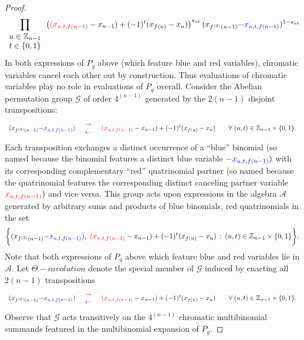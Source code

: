 \begin{proof}
\[\prod_{\begin{array}{c}
u\in\mathbb{Z}_{n-1}\\
t\in\{0,1\}
\end{array}}\big({\color{red}(x_{u,t,f(n-1)}}-x_{n-1})+(-1)^{t}(x_{f(u)}-x_{u})\big)^{s_{ut}}\,(x_{f^{(2)}(n-1)}{\color{blue}-x_{u,t,f(n-1)}}{\color{blue})}^{1-s_{ut}}
\]
In both expressions of $P_{g}$ above (which feature blue and red variables), chromatic variables cancel each other out by construction. Thus evaluations of chromatic variables play no role in evaluations of $P_{g}$ overall.
Consider the Abelian permutation group $\mathcal{G}$ of order $4^{(n-1)}$ generated by the $2(n-1)$ disjoint transpositions:
\[
\begin{array}{ccccc}
(x_{f^{(2)}(n-1)}{\color{blue}-x_{u,t,f(n-1)}}{\color{blue})} & \begin{array}{c}
{\color{red}\rightarrow}\\
{\color{blue}\leftarrow}
\end{array} & {\color{red}(x_{u,t,f(n-1)}}-x_{n-1})+(-1)^{t}(x_{f(u)}-x_{u}) &  & \forall\;(u,t)\in\mathbb{Z}_{n-1}\times\{0,1\}.\end{array}
\]
Each transposition exchanges a distinct occurrence of a “blue” binomial (so named because the binomial features a distinct blue variable ${\color{blue}-x_{u,t,f(n-1)}})$ with its corresponding complementary “red” quatrinomial partner (so named because the quatrinomial features the corresponding distinct canceling partner variable ${\color{red}x_{u,t,f(n-1)}})$ and vice versa. This group acts upon expressions in the algebra $\mathcal{A}$ generated by arbitrary sums and products of blue binomials, red quatrinomials in the set
\[
\bigg\{(x_{f^{(2)}(n-1)}{\color{blue}-x_{u,t,f(n-1)}}{\color{blue})},\ {\color{red}(x_{u,t,f(n-1)}}-x_{n-1})+(-1)^{t}(x_{f(u)}-x_{u})\,:\,(u,t)\in\mathbb{Z}_{n-1}\times\{0,1\}\bigg\}.
\]
Note that both expressions of $P_{g}$ above which feature blue and red variables lie in $\mathcal{A}$.
 Let $\Theta-involution$ denote the special member of $\mathcal{G}$ induced by enacting all $2(n-1)$ transpositions
 \[
 \begin{array}{ccccc}
(x_{f^{(2)}(n-1)}{\color{blue}-x_{u,t,f(n-1)}}{\color{blue})} & \begin{array}{c}
{\color{red}\rightarrow}\\
{\color{blue}\leftarrow}
\end{array} & {\color{red}(x_{u,t,f(n-1)}}-x_{n-1})+(-1)^{t}(x_{f(u)}-x_{u}) &  & \forall\;(u,t)\in\mathbb{Z}_{n-1}\times\{0,1\}.\end{array}
 \]
  Observe that $\mathcal{G}$ acts transitively on the $4^{(n-1)}$ chromatic multibinomial summands featured in the multibinomial expansion of $P_{g}$.


\end{proof}
